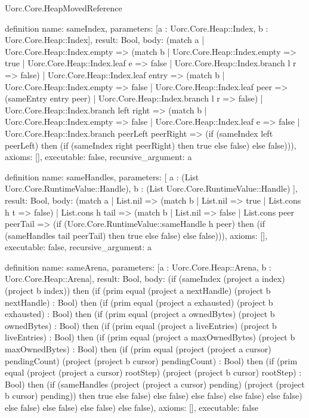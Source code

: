 \begin{lexlean}{Uorc.Core.HeapMovedReference}
\begin{semanticmodule}
definition{
  name: sameIndex,
  parameters: [a : Uorc.Core.Heap::Index, b : Uorc.Core.Heap::Index],
  result: Bool,
  body: (match a
    | Uorc.Core.Heap::Index.empty => (match b
      | Uorc.Core.Heap::Index.empty => true
      | Uorc.Core.Heap::Index.leaf e => false
      | Uorc.Core.Heap::Index.branch l r => false)
    | Uorc.Core.Heap::Index.leaf entry => (match b
      | Uorc.Core.Heap::Index.empty => false
      | Uorc.Core.Heap::Index.leaf peer => (sameEntry entry peer)
      | Uorc.Core.Heap::Index.branch l r => false)
    | Uorc.Core.Heap::Index.branch left right => (match b
      | Uorc.Core.Heap::Index.empty => false
      | Uorc.Core.Heap::Index.leaf e => false
      | Uorc.Core.Heap::Index.branch peerLeft peerRight => (if (sameIndex left peerLeft) then (if (sameIndex right peerRight) then true else false) else false))),
  axioms: [],
  executable: false,
  recursive_argument: a
}

definition{
  name: sameHandles,
  parameters: [
    a : (List Uorc.Core.RuntimeValue::Handle),
    b : (List Uorc.Core.RuntimeValue::Handle)
  ],
  result: Bool,
  body: (match a
    | List.nil => (match b | List.nil => true | List.cons h t => false)
    | List.cons h tail => (match b
      | List.nil => false
      | List.cons peer peerTail => (if (Uorc.Core.RuntimeValue::sameHandle h peer) then (if (sameHandles tail peerTail) then true else false) else false))),
  axioms: [],
  executable: false,
  recursive_argument: a
}

definition{
  name: sameArena,
  parameters: [a : Uorc.Core.Heap::Arena, b : Uorc.Core.Heap::Arena],
  result: Bool,
  body: (if (sameIndex (project a index) (project b index)) then (if (prim equal (project a nextHandle) (project b nextHandle) : Bool) then (if (prim equal (project a exhausted) (project b exhausted) : Bool) then (if (prim equal (project a ownedBytes) (project b ownedBytes) : Bool) then (if (prim equal (project a liveEntries) (project b liveEntries) : Bool) then (if (prim equal (project a maxOwnedBytes) (project b maxOwnedBytes) : Bool) then (if (prim equal (project (project a cursor) pendingCount) (project (project b cursor) pendingCount) : Bool) then (if (prim equal (project (project a cursor) rootStep) (project (project b cursor) rootStep) : Bool) then (if (sameHandles (project (project a cursor) pending) (project (project b cursor) pending)) then true else false) else false) else false) else false) else false) else false) else false) else false) else false),
  axioms: [],
  executable: false
}


\end{semanticmodule}
\end{lexlean}
